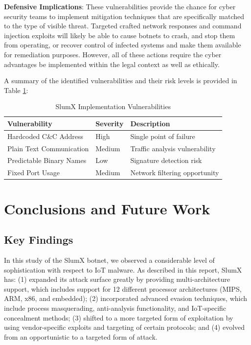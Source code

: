\documentclass[12pt,letterpaper]{report}
\begin{document}
\textbf{Defensive Implications}: These vulnerabilities provide the chance for cyber security teams to implement mitigation techniques that are specifically matched to the type of visible threat. Targeted crafted network responses and command injection exploits will likely be able to cause botnets to crash, and stop them from operating, or recover control of infected systems and make them available for remediation purposes. However, all of these actions require the cyber advantages be implemented within the legal context as well as ethically\cite{zhang2022deep}.

A summary of the identified vulnerabilities and their risk levels is provided in Table \ref{tab:vulnerabilities}:

\begin{table}[H]
\centering
\caption{SlumX Implementation Vulnerabilities}
\label{tab:vulnerabilities}
\begin{tabular}{|l|l|p{5cm}|}
\hline
\textbf{Vulnerability} & \textbf{Severity} & \textbf{Description} \\
\hline
Hardcoded C\&C Address & High & Single point of failure \\
Plain Text Communication & Medium & Traffic analysis vulnerability \\
Predictable Binary Names & Low & Signature detection risk \\
Fixed Port Usage & Medium & Network filtering opportunity \\
\hline
\end{tabular}
\end{table}

\chapter{Conclusions and Future Work}

\section{Key Findings}

In this study of the SlumX botnet, we observed a considerable level of sophistication with respect to IoT malware. As described in this report, SlumX has: (1) expanded its attack surface greatly by providing multi-architecture support, which includes support for 12 different processor architectures (MIPS, ARM, x86, and embedded); (2) incorporated advanced evasion techniques, which include process masquerading, anti-analysis functionality, and IoT-specific concealment methods; (3) shifted to a more targeted form of exploitation by using vendor-specific exploits and targeting of certain protocols; and (4) evolved from an opportunistic to a targeted form of attack.
\end{document}

